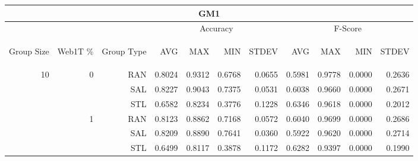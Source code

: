 \begin{center}
\begin{table}[htbp] 
 \begin{center}
\begin{tabular}{ | r | r | r | r | r | r | r | r | r | r | r |}
\hline
\multicolumn{11}{|c|}{GM1}\\
\hline
 & & & \multicolumn{4}{|c|}{Accuracy} & \multicolumn{4}{|c|}{F-Score}\\ \cline{4-11}
\begin{sideways}Group Size\end{sideways} & \begin{sideways}Web1T \%\end{sideways} & \begin{sideways}Group Type\end{sideways} & \begin{sideways}AVG\end{sideways} & \begin{sideways}MAX\end{sideways} & \begin{sideways}MIN\end{sideways} & \begin{sideways}STDEV\end{sideways} & \begin{sideways}AVG\end{sideways} & \begin{sideways}MAX\end{sideways} & \begin{sideways}MIN\end{sideways} & \begin{sideways}STDEV\end{sideways}\\
\hline
\multirow{18}{*}{10}
 & \multirow{3}{*}{0} & RAN & 0.8024 & 0.9312 & 0.6768 & 0.0655 & 0.5981 & 0.9778 & 0.0000 & 0.2636\\ \cline{3-11}
 &   & SAL & 0.8227 & 0.9043 & 0.7375 & 0.0531 & 0.6038 & 0.9660 & 0.0000 & 0.2671\\ \cline{3-11}
 &   & STL & 0.6582 & 0.8234 & 0.3776 & 0.1228 & 0.6346 & 0.9618 & 0.0000 & 0.2012\\ \cline{2-11}
 & \multirow{3}{*}{1} & RAN & 0.8123 & 0.8862 & 0.7168 & 0.0572 & 0.6040 & 0.9699 & 0.0000 & 0.2686\\ \cline{3-11}
 &   & SAL & 0.8209 & 0.8890 & 0.7641 & 0.0360 & 0.5922 & 0.9620 & 0.0000 & 0.2714\\ \cline{3-11}
 &   & STL & 0.6499 & 0.8117 & 0.3878 & 0.1172 & 0.6282 & 0.9397 & 0.0000 & 0.1990\\ \cline{2-11}

\end{tabular}
\end{center}
\end{table}
\end{center}
